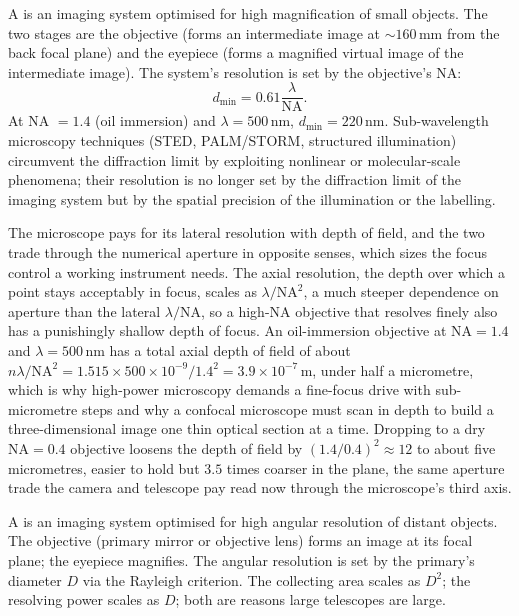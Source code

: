 A  is an imaging system optimised for high
magnification of small objects. The two stages are the objective
(forms an intermediate image at $\sim 160\,\si{\milli\meter}$ from
the back focal plane) and the eyepiece (forms a magnified virtual
image of the intermediate image). The system's resolution is set by
the objective's NA:
\[
d_{\min} = 0.61\frac{\lambda}{\text{NA}}.
\]
At NA $= 1.4$ (oil immersion) and $\lambda = 500\,\si{\nano\meter}$,
$d_{\min} = 220\,\si{\nano\meter}$. Sub-wavelength microscopy
techniques (STED, PALM/STORM, structured illumination) circumvent the
diffraction limit by exploiting nonlinear or molecular-scale
phenomena; their resolution is no longer set by the diffraction limit
of the imaging system but by the spatial precision of the
illumination or the labelling.

The microscope pays for its lateral resolution with depth of field, and the two
trade through the numerical aperture in opposite senses, which sizes the focus
control a working instrument needs. The axial resolution, the depth over which a
point stays acceptably in focus, scales as $\lambda/\mathrm{NA}^2$, a much steeper
dependence on aperture than the lateral $\lambda/\mathrm{NA}$, so a high-NA
objective that resolves finely also has a punishingly shallow depth of focus. An
oil-immersion objective at $\mathrm{NA} = 1.4$ and $\lambda = 500\,\si{\nano
\meter}$ has a total axial depth of field of about
$n\lambda/\mathrm{NA}^2 = 1.515\times 500\times 10^{-9}/1.4^2 = 3.9\times
10^{-7}\,\si{\meter}$, under half a micrometre, which is why high-power microscopy
demands a fine-focus drive with sub-micrometre steps and why a confocal microscope
must scan in depth to build a three-dimensional image one thin optical section at
a time. Dropping to a dry $\mathrm{NA} = 0.4$ objective loosens the depth of field
by $(1.4/0.4)^2 \approx 12$ to about five micrometres, easier to hold but $3.5$
times coarser in the plane, the same aperture trade the camera and telescope pay
read now through the microscope's third axis.

A  is an imaging system optimised for high angular
resolution of distant objects. The objective (primary mirror or
objective lens) forms an image at its focal plane; the eyepiece
magnifies. The angular resolution is set by the primary's diameter
$D$ via the Rayleigh criterion. The collecting area scales as $D^{2}$;
the resolving power scales as $D$; both are reasons large telescopes
are large.

